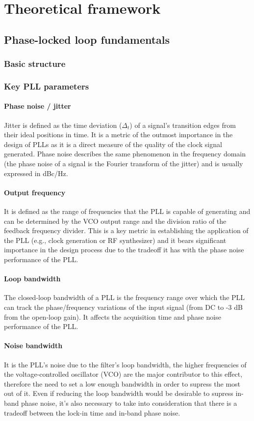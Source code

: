 \chapter{Theoretical framework}

\section{Phase-locked loop fundamentals}
\subsection{Basic structure}
\subsection{Key PLL parameters}
\subsubsection{Phase noise / jitter}
Jitter is defined as the time deviation ($\Delta_t$) of a signal's transition edges from their ideal positions in time. It is a metric of the outmost importance in the design of PLLs 
as it is a direct measure of the quality of the clock signal generated. Phase noise describes the same phenomenon in the frequency domain (the phase noise of a signal is the Fourier 
transform of the jitter) and is usually expressed in dBc/Hz.
\subsubsection{Output frequency}
It is defined as the range of frequencies that the PLL is capable of generating and can be determined by the VCO output range and the division ratio of the feedback frequency divider. This
is a key metric in establishing the application of the PLL (e.g., clock generation or RF synthesizer) and it bears significant importance in the design process due to the tradeoff 
it has with the phase noise performance of the PLL.
\subsubsection{Loop bandwidth}
The closed-loop bandwidth of a PLL is the frequency range over which the PLL can track the phase/frequency variations of the input signal (from DC to -3 dB from the open-loop 
gain). It affects the acquisition time and phase noise performance of the PLL.
\subsubsection{Noise bandwidth}
It is the PLL's noise due to the filter's loop bandwidth, the higher frequencies of the voltage-controlled oscillator (VCO) are the major
contributor to this effect, therefore the need to set a low enough bandwidth in order to supress the most out of it. Even if reducing the loop
bandwidth would be desirable to supress in-band phase noise, it's also necessary to take into consideration that there is a tradeoff between the
lock-in time and in-band phase noise.
